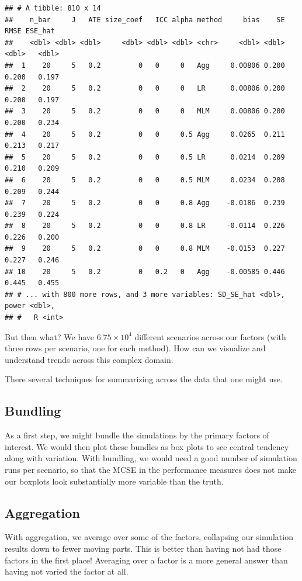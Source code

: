 \documentclass[
]{book}
\begin{document}
\begin{verbatim}
## # A tibble: 810 x 14
##    n_bar     J   ATE size_coef   ICC alpha method     bias    SE  RMSE ESE_hat
##    <dbl> <dbl> <dbl>     <dbl> <dbl> <dbl> <chr>     <dbl> <dbl> <dbl>   <dbl>
##  1    20     5   0.2         0   0     0   Agg     0.00806 0.200 0.200   0.197
##  2    20     5   0.2         0   0     0   LR      0.00806 0.200 0.200   0.197
##  3    20     5   0.2         0   0     0   MLM     0.00806 0.200 0.200   0.234
##  4    20     5   0.2         0   0     0.5 Agg     0.0265  0.211 0.213   0.217
##  5    20     5   0.2         0   0     0.5 LR      0.0214  0.209 0.210   0.209
##  6    20     5   0.2         0   0     0.5 MLM     0.0234  0.208 0.209   0.244
##  7    20     5   0.2         0   0     0.8 Agg    -0.0186  0.239 0.239   0.224
##  8    20     5   0.2         0   0     0.8 LR     -0.0114  0.226 0.226   0.200
##  9    20     5   0.2         0   0     0.8 MLM    -0.0153  0.227 0.227   0.246
## 10    20     5   0.2         0   0.2   0   Agg    -0.00585 0.446 0.445   0.455
## # ... with 800 more rows, and 3 more variables: SD_SE_hat <dbl>, power <dbl>,
## #   R <int>
\end{verbatim}

But then what?
We have \ensuremath{6.75\times 10^{4}} different scenarios across our factors (with three rows per scenario, one for each method).
How can we visualize and understand trends across this complex domain.

There several techniques for summarizing across the data that one might use.

\hypertarget{bundling}{%
\subsection{Bundling}\label{bundling}}

As a first step, we might bundle the simulations by the primary factors of interest.
We would then plot these bundles as box plots to see central tendency along with variation.
With bundling, we would need a good number of simulation runs per scenario, so that the MCSE in the performance measures does not make our boxplots look substantially more variable than the truth.

\hypertarget{aggregation}{%
\subsection{Aggregation}\label{aggregation}}

With aggregation, we average over some of the factors, collapsing our simulation results down to fewer moving parts.
This is better than having not had those factors in the first place!
Averaging over a factor is a more general answer than having not varied the factor at all.
\end{document}
